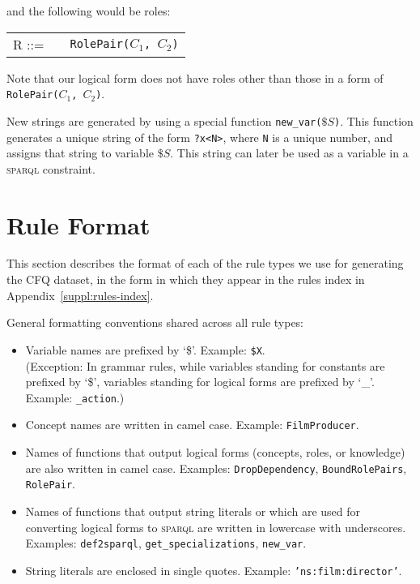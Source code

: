 \documentclass[letterpaper]{article}
\newcommand{\SPARQL}{\textsc{sparql}}
\begin{document}
and the following would be roles:
 
\begin{tabular}{r cl}
    R ::= & & \texttt{RolePair($C_1$, $C_2$)}
\end{tabular}


Note that our logical form does not have roles other than those in a form of \texttt{RolePair($C_1$, $C_2$)}.

New strings are generated by using a special function \texttt{new\_var($\$S$)}. This function generates a unique string of the form \texttt{?x<N>}, where \texttt{N} is a unique number, and assigns that string to variable $\$S$. This string can later be used as a variable in a \SPARQL{} constraint.

\section{Rule Format}
\label{suppl:rules-format}

This section describes the format of each of the rule types we use for generating the CFQ dataset, in the form in which they appear in the rules index in Appendix~\ref{suppl:rules-index}.

General formatting conventions shared across all rule types:

\begin{itemize}
    \item Variable names are prefixed by `\$'. Example: \texttt{\$X}.\\
    (Exception: In grammar rules, while variables standing for constants are prefixed by `\$', variables standing for logical forms are prefixed by `\_'. Example: \texttt{\_action}.)
    \item Concept names are written in camel case. Example: \texttt{FilmProducer}.
    \item Names of functions that output logical forms (concepts, roles, or knowledge) are also written in camel case. Examples: \texttt{DropDependency}, \texttt{BoundRolePairs}, \texttt{RolePair}.
    \item Names of functions that output string literals or which are used for converting logical forms to \SPARQL{} are written in lowercase with underscores. Examples: \texttt{def2sparql}, \texttt{get\_specializations}, \texttt{new\_var}.
    \item String literals are enclosed in single quotes. Example: \texttt{'ns:film:director'}.
\end{itemize}
\end{document}
